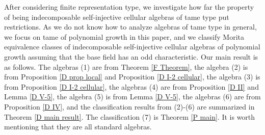 \documentclass[12pt]{amsart}
\numberwithin{equation}{thm}
\newcounter{ni}
\begin{document}
After considering finite representation type, we investigate how far the property of being indecomposable self-injective cellular algebras 
of tame type put restrictions. As we do not know how to analyze algebras of tame type in general, 
we focus on tame of polynomial growth in this paper, and
we classify Morita equivalence classes of indecomposable self-injective cellular algebras of polynomial growth 
assuming that the base field has an odd characteristic. Our main result is as follows.
The algebras (1) are from Theorem \ref{F Theorem}, the algebra (2) is from Proposition \ref{D prop local} and Proposition \ref{D I-2 cellular}, 
the algebra (3) is from Proposition \ref{D I-2 cellular}, the algebras (4) are from Proposition \ref{D II} 
and Lemma \ref{D V-5}, the algebra (5) is from Lemma \ref{D V-5}, 
the algebras (6) are from Proposition \ref{D IV}, and the classification results from (2)-(6) are
summarized in Theorem \ref{D main result}. The classification (7) is Theorem \ref{P main}. 
It is worth mentioning that they are all standard algebras. 
\end{document}
